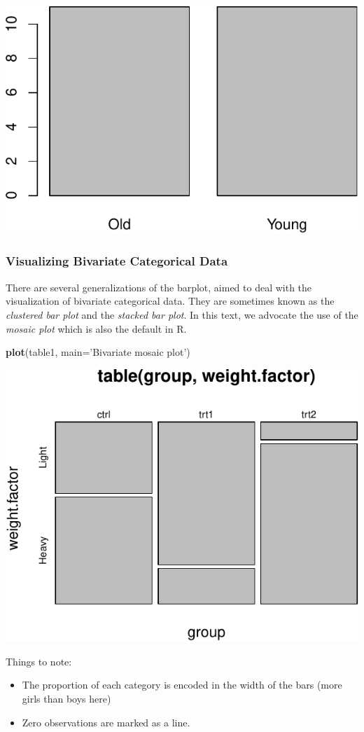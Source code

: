 \documentclass[]{book}
\newenvironment{Shaded}{\begin{snugshade}}{\end{snugshade}}
\newcommand{\DataTypeTok}[1]{\textcolor[rgb]{0.13,0.29,0.53}{#1}}
\newcommand{\KeywordTok}[1]{\textcolor[rgb]{0.13,0.29,0.53}{\textbf{#1}}}
\newcommand{\NormalTok}[1]{#1}
\newcommand{\StringTok}[1]{\textcolor[rgb]{0.31,0.60,0.02}{#1}}
\providecommand{\tightlist}{%
  \setlength{\itemsep}{0pt}\setlength{\parskip}{0pt}}
\theoremstyle{definition}
\theoremstyle{definition}
\theoremstyle{definition}
\theoremstyle{remark}
\begin{document}
\includegraphics[width=0.5\linewidth]{Rcourse_files/figure-latex/barplot-1}

\hypertarget{visualizing-bivariate-categorical-data}{%
\subsubsection{Visualizing Bivariate Categorical Data}\label{visualizing-bivariate-categorical-data}}

There are several generalizations of the barplot, aimed to deal with the visualization of bivariate categorical data.
They are sometimes known as the \emph{clustered bar plot} and the \emph{stacked bar plot}.
In this text, we advocate the use of the \emph{mosaic plot} which is also the default in R.

\begin{Shaded}
\begin{Highlighting}[]
\KeywordTok{plot}\NormalTok{(table1, }\DataTypeTok{main=}\StringTok{'Bivariate mosaic plot'}\NormalTok{)}
\end{Highlighting}
\end{Shaded}

\includegraphics[width=0.5\linewidth]{Rcourse_files/figure-latex/unnamed-chunk-129-1}

Things to note:

\begin{itemize}
\tightlist
\item
  The proportion of each category is encoded in the width of the bars (more girls than boys here)
\item
  Zero observations are marked as a line.
\end{itemize}
\end{document}
